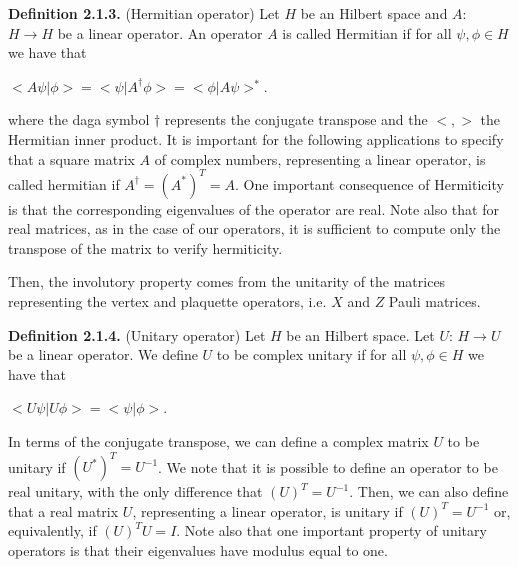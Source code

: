 \documentclass[12pt]{report}
\begin{document}
	
	\begin{minipage}{1\textwidth}	
		
		
		\textbf{Definition 2.1.3.} (Hermitian operator) Let $H$ be an Hilbert space and  $A$: $H \rightarrow H$ be a linear operator. An operator $A$ is called Hermitian if for all $\psi,\phi \in H$ we have that\newline
		
		\begin{center}
			$<A\psi|\phi> = <\psi|A^{\dagger}\phi> = <\phi|A\psi>^{*}$.
		\end{center}
		
		where the daga symbol $\dagger$ represents the conjugate transpose and the $<,>$ the Hermitian inner product. \newline
		It is important for the following applications to specify that a square matrix $A$ of complex numbers, representing a linear operator, is called hermitian if $A^{\dagger} = (A^*)^T = A$. One important consequence of Hermiticity is that the corresponding eigenvalues of the operator are real. Note also that for real matrices, as in the case of our operators, it is sufficient to compute only the transpose of the matrix to verify hermiticity. \newline
		
		Then, the involutory property comes from the unitarity of the matrices representing the vertex and plaquette operators, i.e. $X$ and $Z$ Pauli matrices. \newline
		
		\textbf{Definition 2.1.4.} (Unitary operator) Let $H$ be an Hilbert space. Let $U$: $H \rightarrow U$ be a linear operator. We define $U$ to be complex unitary if for all $\psi,\phi \in H$ we have that\newline
		
		\begin{center}
			$<U\psi|U\phi> = <\psi|\phi>$.
		\end{center}
		
	    In terms of the conjugate transpose, we can define a complex matrix $U$ to be unitary if $ (U^*)^T=U^{-1}$. We note that it is possible to define an operator to be real unitary, with the only difference that $(U)^T = U^{-1}$. Then, we can also define that a real matrix $U$, representing a linear operator, is unitary if $(U)^T = U^{-1}$ or, equivalently, if $(U)^T U=I$. Note also that one important property of  unitary operators is that their eigenvalues have modulus equal to one.\newline
		

\end{minipage}
\end{document}
